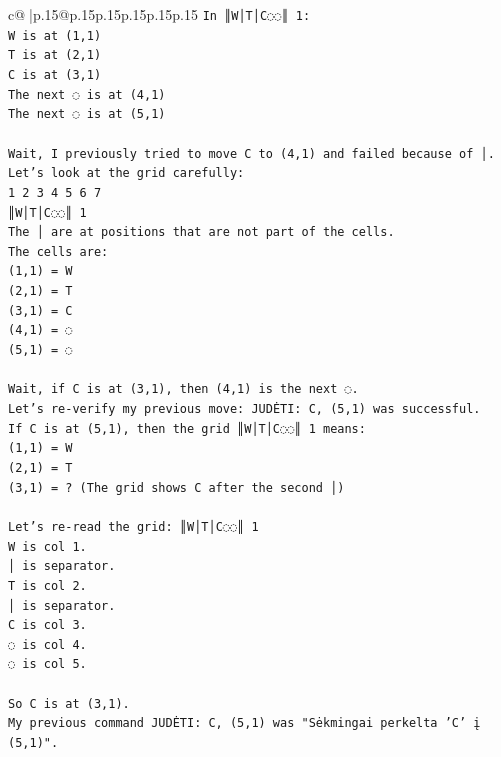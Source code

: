 \documentclass{article}
\begin{document}
{\begin{supertabular}{c@{$\;$}|p{.15\linewidth}@{}p{.15\linewidth}p{.15\linewidth}p{.15\linewidth}p{.15\linewidth}p{.15\linewidth}}
{{{\texttt{In ║W│T│C◌◌║ 1:} \\
\texttt{W is at (1,1)} \\
\texttt{T is at (2,1)} \\
\texttt{C is at (3,1)} \\
\texttt{The next ◌ is at (4,1)} \\
\texttt{The next ◌ is at (5,1)} \\
\\ 
\texttt{Wait, I previously tried to move C to (4,1) and failed because of │.} \\
\texttt{Let's look at the grid carefully:} \\
\texttt{1 2 3 4 5 6 7} \\
\texttt{║W│T│C◌◌║ 1} \\
\texttt{The │ are at positions that are not part of the cells.} \\
\texttt{The cells are:} \\
\texttt{(1,1) = W} \\
\texttt{(2,1) = T} \\
\texttt{(3,1) = C} \\
\texttt{(4,1) = ◌} \\
\texttt{(5,1) = ◌} \\
\\ 
\texttt{Wait, if C is at (3,1), then (4,1) is the next ◌.} \\
\texttt{Let's re{-}verify my previous move: JUDĖTI: C, (5,1) was successful.} \\
\texttt{If C is at (5,1), then the grid ║W│T│C◌◌║ 1 means:} \\
\texttt{(1,1) = W} \\
\texttt{(2,1) = T} \\
\texttt{(3,1) = ? (The grid shows C after the second │)} \\
\\ 
\texttt{Let's re{-}read the grid: ║W│T│C◌◌║ 1} \\
\texttt{W is col 1.} \\
\texttt{│ is separator.} \\
\texttt{T is col 2.} \\
\texttt{│ is separator.} \\
\texttt{C is col 3.} \\
\texttt{◌ is col 4.} \\
\texttt{◌ is col 5.} \\
\\ 
\texttt{So C is at (3,1).} \\
\texttt{My previous command JUDĖTI: C, (5,1) was "Sėkmingai perkelta 'C' į (5,1)".} \\
}}}
\end{supertabular}}
\end{document}
